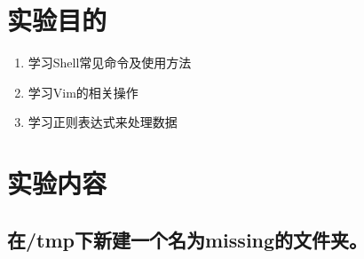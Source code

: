 \documentclass[12pt,a4paper,UTF8]{article}
\begin{document}
    \tableofcontents
    \newpage

    \NoBgThispage
    \section{实验目的}
    \begin{enumerate}    
        \item 学习Shell常见命令及使用方法
        \item 学习Vim的相关操作
        \item 学习正则表达式来处理数据
    \end{enumerate}
    
    \section{实验内容}
    \subsection{在/tmp下新建一个名为missing的文件夹。}
\end{document}
